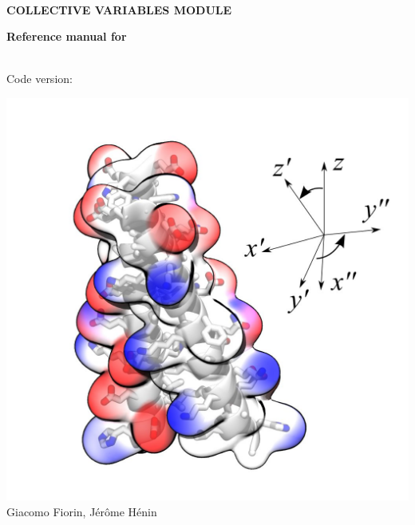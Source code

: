 \documentclass[11pt]{article}
\begin{document}


\begin{titlepage}

  \noindent\colorbox{background-color}{
    \begin{minipage}{1.0\textwidth}

        $\,$\\
        
        \noindent\textsf{\bfseries\Huge COLLECTIVE VARIABLES MODULE\\}
        
        \noindent\textsf{\bfseries\Huge Reference manual for \MDENGINE{} }

        \noindent\textsf{\\Code version: \cvversion\\}

      \end{minipage}}

  \includegraphics[width=\textwidth]{cover.jpg}
  \textsf{\large Giacomo Fiorin, J\'er\^ome H\'enin%
 }
\end{titlepage}

\newpage
\tableofcontents
\newpage

\end{document}
